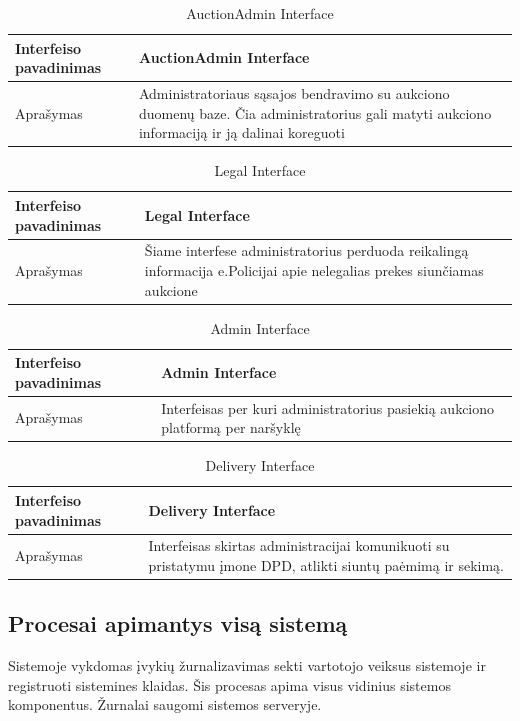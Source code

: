 \documentclass{VUMIFPSmagistrinis}
\begin{document}
				\begin{table}[H]
				\centering
				\begin{tabular}{|L|p{9cm}|}\hline
			 		Interfeiso pavadinimas& AuctionAdmin Interface\\ \hline
			 		Aprašymas& Administratoriaus sąsajos bendravimo su aukciono duomenų baze. Čia administratorius gali matyti aukciono informaciją ir ją dalinai koreguoti \\ \hline
				\end{tabular}
				\caption{AuctionAdmin Interface}
				\end{table}

				\begin{table}[H]
				\centering
				\begin{tabular}{|L|p{9cm}|}\hline
			 		Interfeiso pavadinimas& Legal Interface\\ \hline
			 		Aprašymas& Šiame interfese administratorius perduoda reikalingą informacija e.Policijai apie nelegalias prekes siunčiamas aukcione \\ \hline
				\end{tabular}
				\caption{Legal Interface}
				\end{table}

				\begin{table}[H]
				\centering
				\begin{tabular}{|L|p{9cm}|}\hline
			 		Interfeiso pavadinimas& Admin Interface\\ \hline
			 		Aprašymas& Interfeisas per kuri administratorius pasiekią aukciono platformą per naršyklę \\ \hline
				\end{tabular}
				\caption{Admin Interface}
				\end{table}

				\begin{table}[H]
				\centering
				\begin{tabular}{|L|p{9cm}|}\hline
			 		Interfeiso pavadinimas& Delivery Interface\\ \hline
			 		Aprašymas& Interfeisas skirtas administracijai komunikuoti su pristatymu įmone DPD, atlikti siuntų paėmimą ir sekimą. \\ \hline
				\end{tabular}
				\caption{Delivery Interface}
				\end{table}
			\subsection{Procesai apimantys visą sistemą}
				Sistemoje vykdomas įvykių žurnalizavimas sekti vartotojo veiksus sistemoje ir registruoti sistemines klaidas.
				Šis procesas apima visus vidinius sistemos komponentus.
				Žurnalai saugomi sistemos serveryje.
\end{document}
